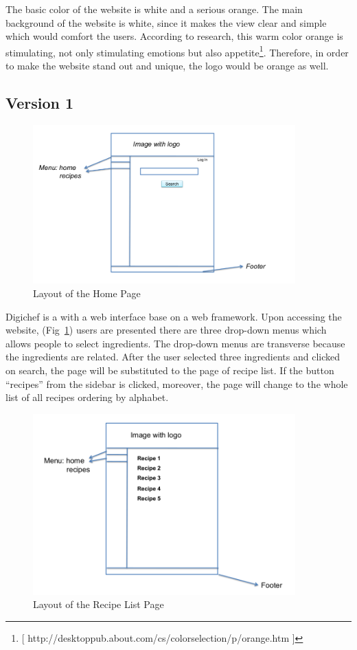 The basic color of the website is white and a serious orange. The main background of the website is white, since it makes the view clear and simple which would comfort the users. According to research, this warm color orange is stimulating, not only stimulating emotions but also appetite\footnote{[ http://desktoppub.about.com/cs/colorselection/p/orange.htm ]}. Therefore, in order to make the website stand out and unique, the logo would be orange as well.

\subsection{Version 1}

\begin{figure}
\includegraphics[width=0.9\textwidth]{home_page}
\caption{Layout of the Home Page}
\label{fig:home_page}
\end{figure}

Digichef is a with a web interface base on a web framework. Upon accessing the website, (Fig~\ref{fig:home_page}) users are presented there are three drop-down menus which allows people to select ingredients. The drop-down menus are transverse because the ingredients are related. After the user selected three ingredients and clicked on search, the page will be substituted to the page of recipe list. If the button “recipes” from the sidebar is clicked, moreover, the page will change to the whole list of all recipes ordering by alphabet.

\begin{figure}
\includegraphics[width=0.9\textwidth]{recipe_list_page}
\caption{Layout of the Recipe List Page}
\label{fig:recipe_list}
\end{figure}

